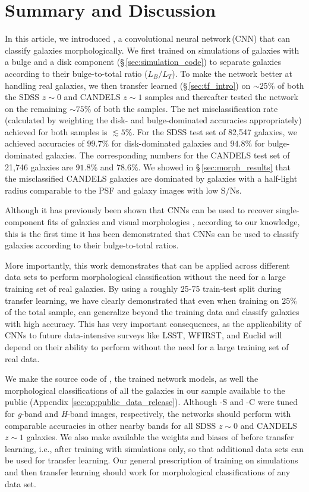 \section{Summary and Discussion} \label{sec:disc}
In this article, we introduced \gamornet{}, a convolutional neural network\,(CNN) that can classify galaxies morphologically. We first trained \gamornet{} on simulations of galaxies with a bulge and a disk component (\S\,\ref{sec:simulation_code}) to separate galaxies according to their bulge-to-total ratio ($L_B/L_T$). To make the network better at handling real galaxies, we then transfer learned (\S\,\ref{sec:tf_intro}) on $\sim25\%$ of both the SDSS $z\sim0$ and CANDELS $z\sim1$ samples and thereafter tested the network on the remaining $\sim75\%$ of both the samples. The net misclassification rate (calculated by weighting the disk- and bulge-dominated accuracies appropriately) achieved for both samples is $\lesssim 5\%$. For the SDSS test set of 82,547 galaxies, we achieved accuracies of $99.7\%$ for disk-dominated galaxies and $94.8\%$ for bulge-dominated galaxies. The corresponding numbers for the CANDELS test set of 21,746 galaxies are $91.8\%$ and $78.6\%$. We showed in \S\,\ref{sec:morph_results} that the misclassified CANDELS galaxies are dominated by galaxies with a half-light radius comparable to the PSF and galaxy images with low S/Ns. 

Although it has previously been shown that CNNs can be used to recover single-component \sersic{} fits of galaxies and visual morphologies \citep[eg.][]{company_15,tuccillo_18}, according to our knowledge, this is the first time it has been demonstrated that CNNs can be used to classify galaxies according to their bulge-to-total ratios.

More importantly, this work demonstrates that \gamornet{} can be applied across different data sets to perform morphological classification without the need for a large training set of real galaxies. By using a roughly 25-75 train-test split during transfer learning, we have clearly demonstrated that even when training on $25\%$ of the total sample, \gamornet{} can generalize beyond the training data and classify galaxies with high accuracy. This has very important consequences, as the applicability of CNNs to future data-intensive surveys like LSST, WFIRST, and Euclid will depend on their ability to perform without the need for a large training set of real data.

We make the source code of \gamornet{}, the trained network models, as well the morphological classifications of all the galaxies in our sample available to the public (Appendix \ref{sec:ap:public_data_release}). Although \gamornet{}-S and -C were tuned for \textit{g}-band and \textit{H}-band images, respectively, the networks should perform with comparable accuracies in other nearby bands for all SDSS $z\sim0$ and CANDELS $z\sim1$ galaxies. We also make available the weights and biases of \gamornet{} before transfer learning, i.e., after training with simulations only, so that additional data sets can be used for transfer learning. Our general prescription of training on simulations and then transfer learning should work for morphological classifications of any data set.

